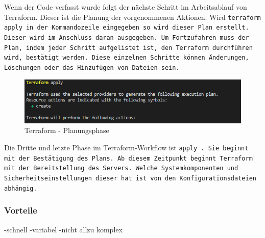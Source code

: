 \begin{otherlanguage}{ngerman}
\newline
Wenn der Code verfasst wurde folgt der nächste Schritt im Arbeitsablauf von Terraform. Dieser ist die Planung der vorgenommenen Aktionen. Wird \tt terraform apply \rm in der Kommandozeile eingegeben so wird dieser Plan erstellt. Dieser wird im Anschluss daran ausgegeben. Um Fortzufahren muss der Plan, indem jeder Schritt aufgelistet ist, den Terraform durchführen wird, bestätigt werden. Diese einzelnen Schritte können Änderungen, Löschungen oder das Hinzufügen von Dateien sein.
\begin{figure}
    \centering
    \includegraphics{LaTeX/graphic/terraformapply.png}
    \caption{Terraform - Planungsphase}
\end{figure}

\newpage 
Die Dritte und letzte Phase im Terraform-Workflow ist \tt apply \rm. Sie beginnt mit der Bestätigung des Plans. Ab diesem Zeitpunkt beginnt Terraform mit der Bereitstellung des Servers. Welche Systemkomponenten und Sicherheitseinstellungen dieser hat ist von den Konfigurationsdateien abhängig. 

\subsubsection{Vorteile}
-schnell
\newline
-variabel
\newline
-nicht allzu komplex
\end{otherlanguage}